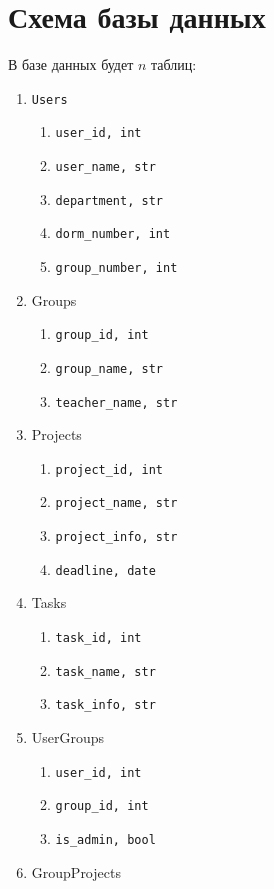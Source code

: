 \documentclass[12pt,a4paper,notitlepage]{article}
\begin{document}
\section{Схема базы данных}

В базе данных будет $n$ таблиц:
\begin{enumerate}
\item \texttt{Users}
    \begin{enumerate}
    \item \texttt{user\_id, int}
    \item \texttt{user\_name, str}
    \item \texttt{department, str}
    \item \texttt{dorm\_number, int}
    \item \texttt{group\_number, int}
    \end{enumerate}
\item Groups
    \begin{enumerate}
    \item \texttt{group\_id, int}
    \item \texttt{group\_name, str}
    \item \texttt{teacher\_name, str}
    \end{enumerate}
\item Projects
    \begin{enumerate}
    \item \texttt{project\_id, int}
    \item \texttt{project\_name, str}
    \item \texttt{project\_info, str}
    \item \texttt{deadline, date}
    \end{enumerate}
\item Tasks
    \begin{enumerate}
    \item \texttt{task\_id, int}
    \item \texttt{task\_name, str}
    \item \texttt{task\_info, str}
    \end{enumerate}
\item UserGroups
    \begin{enumerate}
    \item \texttt{user\_id, int}
    \item \texttt{group\_id, int}
    \item \texttt{is\_admin, bool}
    \end{enumerate}
\item GroupProjects

\end{enumerate}
\end{document}
